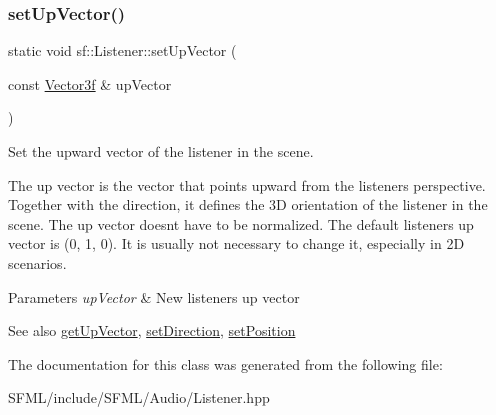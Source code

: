 \subsubsection{\texorpdfstring{setUpVector()}{setUpVector()}\hspace{0.1cm}{\footnotesize\ttfamily [2/2]}}
{\footnotesize\ttfamily static void sf\+::\+Listener\+::set\+Up\+Vector (\begin{DoxyParamCaption}\item[{const \mbox{\hyperlink{classsf_1_1_vector3}{Vector3f}} \&}]{up\+Vector }\end{DoxyParamCaption})\hspace{0.3cm}{\ttfamily [static]}}



Set the upward vector of the listener in the scene. 

The up vector is the vector that points upward from the listener\textquotesingle{}s perspective. Together with the direction, it defines the 3D orientation of the listener in the scene. The up vector doesn\textquotesingle{}t have to be normalized. The default listener\textquotesingle{}s up vector is (0, 1, 0). It is usually not necessary to change it, especially in 2D scenarios.


\begin{DoxyParams}{Parameters}
{\em up\+Vector} & New listener\textquotesingle{}s up vector\\
\hline
\end{DoxyParams}
\begin{DoxySeeAlso}{See also}
\mbox{\hyperlink{classsf_1_1_listener_ae1427dd7e9b425b0c23b7b766bd6c6e6}{get\+Up\+Vector}}, \mbox{\hyperlink{classsf_1_1_listener_ae479dc15513c6557984d26e32d06d06e}{set\+Direction}}, \mbox{\hyperlink{classsf_1_1_listener_a5bc2d8d18ea2d8f339d23cbf17678564}{set\+Position}} \begin{DoxyVerb}\end{DoxyVerb}
 
\end{DoxySeeAlso}


The documentation for this class was generated from the following file\+:\begin{DoxyCompactItemize}
\item 
S\+F\+M\+L/include/\+S\+F\+M\+L/\+Audio/Listener.\+hpp\end{DoxyCompactItemize}
